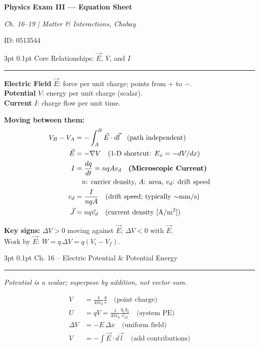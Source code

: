 \documentclass[10pt,twocolumn]{article}
\makeatletter
\renewcommand{\section}{\@startsection{section}{1}{\z@}%
  {3pt \@plus 1pt \@minus 1pt}%
  {0.1pt}%
  {\small\bfseries\color{blue!70!black}}}
\newcommand{\mysection}[1]{%
  \section{#1}%
  \noindent\textcolor{blue!50!black}{\rule{\linewidth}{0.4pt}}\vspace{1pt}%
}
\newcommand{\E}{\vec{E}}
\newenvironment{eqbox}{%
  \begin{mdframed}[linewidth=0.5pt,innerleftmargin=3pt,innerrightmargin=3pt,
    innertopmargin=2pt,innerbottommargin=2pt,backgroundcolor=blue!4]
  \small
}{%
  \end{mdframed}\vspace{1pt}
}
\makeatother
\begin{document}
\footnotesize

{\centering\small\textbf{Physics Exam III --- Equation Sheet}\par
  \textit{Ch. 16--19 | Matter \& Interactions, Chabay}\par
  {ID: 0513544}\par}
\vspace{2pt}

\mysection{Core Relationships: $\E$, $V$, and $I$}

\textbf{Electric Field} $\vec{E}$: force per unit charge; points from $+$ to $-$.\\
\textbf{Potential} $V$: energy per unit charge (scalar).\\
\textbf{Current} $I$: charge flow per unit time.

\begin{eqbox}
\textbf{Moving between them:}
\begin{align*}
  V_B - V_A &= -\int_A^B \vec{E}\cdot d\vec{l} \quad \text{(path independent)}\\
  \vec{E} &= -\nabla V \quad \text{(1-D shortcut: } E_x = -dV/dx\text{)}\\
  I &= \frac{dq}{dt} = nqAv_d \quad \text{\textbf{(Microscopic Current)}}\\
   &\quad \text{$n$: carrier density, $A$: area, $v_d$: drift speed}\\
  v_d &= \frac{I}{nqA} \quad \text{(drift speed; typically $\sim$mm/s)}\\
  \vec{J} &= nq\vec{v}_d \quad \text{(current density [A/m$^2$])}
\end{align*}
\end{eqbox}

\textbf{Key signs:} $\Delta V > 0$ moving against $\vec{E}$; $\Delta V < 0$ with $\vec{E}$.\\
Work by $\vec{E}$: $W = q\,\Delta V = q(V_i - V_f)$.

\mysection{Ch. 16 -- Electric Potential \& Potential Energy}

\textit{Potential is a scalar; superpose by addition, not vector sum.}

\begin{eqbox}
\begin{align*}
  V &= \frac{1}{4\pi\epsilon_0}\frac{q}{r} \quad \text{(point charge)}\\
  U &= qV = \frac{1}{4\pi\epsilon_0}\frac{q_1 q_2}{r_{12}} \quad \text{(system PE)}\\
  \Delta V &= -E\,\Delta x \quad \text{(uniform field)}\\
  V &= -\int \vec{E}\cdot d\vec{l} \quad \text{(add contributions)}
\end{align*}
\end{eqbox}
\end{document}
